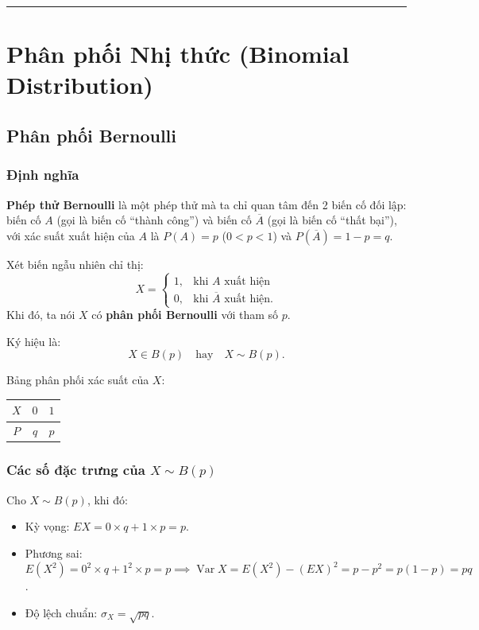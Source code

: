 \vspace{1.5em}
\hrule
\vspace{1.5em}

\section{Phân phối Nhị thức (Binomial Distribution)}

\subsection{Phân phối Bernoulli}

\subsubsection{Định nghĩa}

\begin{dinhnghia}
\textbf{Phép thử Bernoulli} là một phép thử mà ta chỉ quan tâm đến 2 biến cố đối lập: biến cố $A$ (gọi là biến cố ``thành công'') và biến cố $\overline{A}$ (gọi là biến cố ``thất bại''), với xác suất xuất hiện của $A$ là $P(A) = p$ ($0 < p < 1$) và $P(\overline{A}) = 1 - p = q$.

Xét biến ngẫu nhiên chỉ thị:
\[
X = \begin{cases} 
1, & \text{khi } A \text{ xuất hiện} \\ 
0, & \text{khi } \overline{A} \text{ xuất hiện}. 
\end{cases}
\]
Khi đó, ta nói $X$ có \textbf{phân phối Bernoulli} với tham số $p$.

Ký hiệu là:
\[
X \in B(p) \quad \text{hay} \quad X \sim B(p).
\]

Bảng phân phối xác suất của $X$:
\begin{center}
\renewcommand{\arraystretch}{1.3}
\begin{tabular}{|c|c|c|}
\hline
$X$ & $0$ & $1$ \\
\hline
$P$ & $q$ & $p$ \\
\hline
\end{tabular}
\end{center}
\end{dinhnghia}

\subsubsection{Các số đặc trưng của \texorpdfstring{$X \sim B(p)$}{X ~ B(p)}}

\begin{tinhchat}
Cho $X \sim B(p)$, khi đó:
\begin{itemize}
    \item Kỳ vọng: $EX = 0 \times q + 1 \times p = p$.
    \item Phương sai: $E(X^2) = 0^2 \times q + 1^2 \times p = p \implies \operatorname{Var} X = E(X^2) - (EX)^2 = p - p^2 = p(1 - p) = pq$.
    \item Độ lệch chuẩn: $\sigma_X = \sqrt{pq}$.
\end{itemize}
\end{tinhchat}

